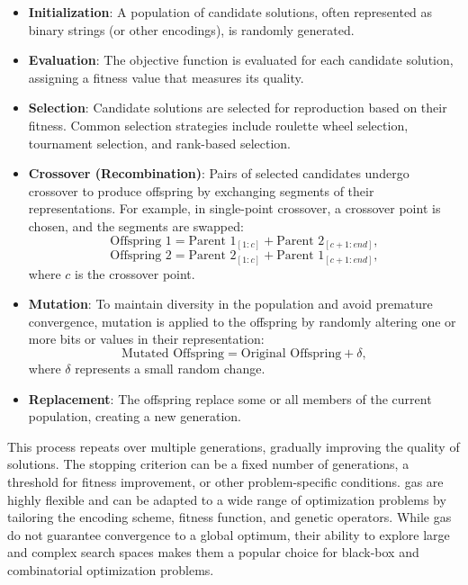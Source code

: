 \begin{itemize}
    \item \textbf{Initialization}: A population of candidate solutions, often represented as binary strings (or other encodings), is randomly generated.
    
    \item \textbf{Evaluation}: The objective function is evaluated for each candidate solution, assigning a fitness value that measures its quality.
    
    \item \textbf{Selection}: Candidate solutions are selected for reproduction based on their fitness. Common selection strategies include roulette wheel selection, tournament selection, and rank-based selection.
    
    \item \textbf{Crossover (Recombination)}: Pairs of selected candidates undergo crossover to produce offspring by exchanging segments of their representations. For example, in single-point crossover, a crossover point is chosen, and the segments are swapped:
    \begin{equation*}
    \text{Offspring 1} = \text{Parent 1}_{[1:c]} + \text{Parent 2}_{[c+1:end]},
    \end{equation*}
    \begin{equation*}
    \text{Offspring 2} = \text{Parent 2}_{[1:c]} + \text{Parent 1}_{[c+1:end]},
    \end{equation*}
    where \(c\) is the crossover point.
    
    \item \textbf{Mutation}: To maintain diversity in the population and avoid premature convergence, mutation is applied to the offspring by randomly altering one or more bits or values in their representation:
    \begin{equation*}
    \text{Mutated Offspring} = \text{Original Offspring} + \delta,
    \end{equation*}
    where \(\delta\) represents a small random change.
    
    \item \textbf{Replacement}: The offspring replace some or all members of the current population, creating a new generation.
\end{itemize}

This process repeats over multiple generations, gradually improving the quality of solutions. The stopping criterion can be a fixed number of generations, a threshold for fitness improvement, or other problem-specific conditions.
\acp{ga} are highly flexible and can be adapted to a wide range of optimization problems by tailoring the encoding scheme, fitness function, and genetic operators. While \acp{ga} do not guarantee convergence to a global optimum, their ability to explore large and complex search spaces makes them a popular choice for black-box and combinatorial optimization problems.


